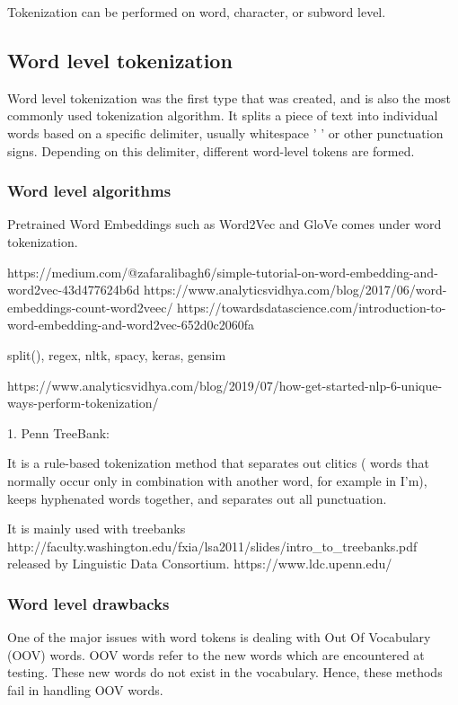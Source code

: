 Tokenization can be performed on word, character, or subword level.

\subsection{Word level tokenization}

Word level tokenization was the first type that was created, and is also the most commonly used tokenization algorithm. It splits a piece of text into individual words based on a specific delimiter, usually whitespace ' ' or other punctuation signs. Depending on this delimiter, different word-level tokens are formed.

\subsubsection{Word level algorithms}

Pretrained Word Embeddings such as Word2Vec and GloVe comes under word tokenization.

https://medium.com/@zafaralibagh6/simple-tutorial-on-word-embedding-and-word2vec-43d477624b6d
https://www.analyticsvidhya.com/blog/2017/06/word-embeddings-count-word2veec/
https://towardsdatascience.com/introduction-to-word-embedding-and-word2vec-652d0c2060fa

split(), regex, nltk, spacy, keras, gensim

https://www.analyticsvidhya.com/blog/2019/07/how-get-started-nlp-6-unique-ways-perform-tokenization/

1. Penn TreeBank:

It is a rule-based tokenization method that separates out clitics ( words that normally occur only in combination with another word, for example in I’m), keeps hyphenated words together, and separates out all punctuation.

It is mainly used with treebanks http://faculty.washington.edu/fxia/lsa2011/slides/intro\_to\_treebanks.pdf released by Linguistic Data Consortium. https://www.ldc.upenn.edu/

\subsubsection{Word level drawbacks}

One of the major issues with word tokens is dealing with Out Of Vocabulary (OOV) words. OOV words refer to the new words which are encountered at testing. These new words do not exist in the vocabulary. Hence, these methods fail in handling OOV words.

